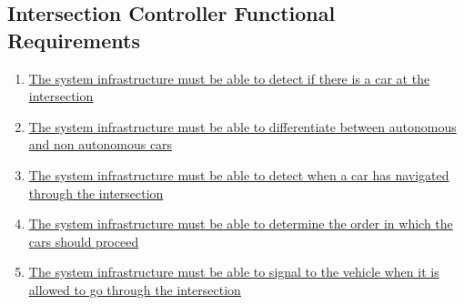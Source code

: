 \documentclass [11pt]{article}
\begin{document}
\subsection{Intersection Controller Functional Requirements}
\begin{enumerate}[label=\textbf{IC\arabic*:}, ref =IC\arabic*, leftmargin=0.8in]

	\item \label{IC1} \hyperref[sec:changeL]{The system infrastructure must be able to detect if there is a car at the intersection } %

	
	\item \label{IC2}\hyperref[sec:changeL]{The system infrastructure must be able to differentiate between autonomous and non autonomous cars} %
	
	\item \label{IC3}\hyperref[sec:changeL]{The system infrastructure must be able to detect when a car has navigated through the intersection} %

    \item \label{IC4}\hyperref[sec:changeL]{The system infrastructure must be able to determine the order in which the cars should proceed} %
    
    \item \label{IC5} \hyperref[sec:changeL]{The system infrastructure must be able to signal to the vehicle when it is allowed to go through the intersection} %
\end{enumerate}
\end{document}
